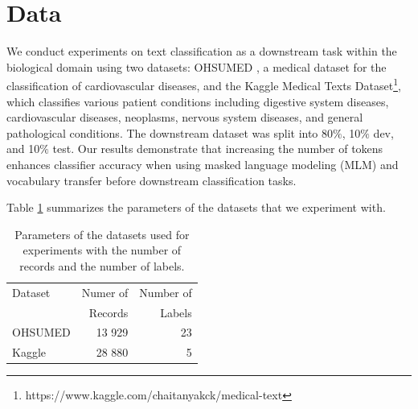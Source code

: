 \documentclass[11pt]{article}
\begin{document}

\section{Data}

We conduct experiments on text classification as a downstream task within the biological domain \cite{mujtaba2019clinical, gao2021limitations, hughes2017medical} using two datasets: OHSUMED \cite{hersh1994ohsumed}, a medical dataset for the classification of cardiovascular diseases, and the Kaggle Medical Texts Dataset\footnote{https://www.kaggle.com/chaitanyakck/medical-text}, which classifies various patient conditions including digestive system diseases, cardiovascular diseases, neoplasms, nervous system diseases, and general pathological conditions. The downstream dataset was split into 80$\%$, 10$\%$ dev, and 10$\%$ test. Our results demonstrate that increasing the number of tokens enhances classifier accuracy when using masked language modeling (MLM) and vocabulary transfer before downstream classification tasks.

Table \ref{tab:data} summarizes the parameters of the datasets that we experiment with.


\begin{table}[h]
\centering
\begin{tabular}{lrr}
 Dataset & Numer of  & Number of  \\
 & Records & Labels\\
\hline
OHSUMED & 13 929 & 23 \\
Kaggle & 28 880 & 5 \\
\hline
\end{tabular}
\caption{Parameters of the datasets used for experiments with the number of records and the number of labels.}
\label{tab:data}
\end{table}
\end{document}
